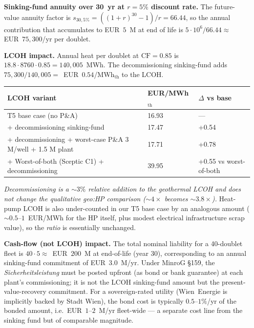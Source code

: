 \documentclass{article}
\begin{document}
\textbf{Sinking-fund annuity over 30~yr at $r = 5\%$ discount rate.}
The future-value annuity factor is
$s_{30,5\%} = ((1+r)^{30} - 1)/r = 66.44$, so the annual contribution
that accumulates to EUR~$5$~M at end of life is
$5 \cdot 10^{6} / 66.44 \approx$ EUR~$75{,}300$/yr per doublet.

\textbf{LCOH impact.} Annual heat per doublet at $\mathrm{CF}=0.85$ is
$18.8 \cdot 8760 \cdot 0.85 = 140{,}005$~MWh. The decommissioning
sinking-fund adds
$75{,}300 / 140{,}005 = $~EUR~$0.54$/MWh$_{\mathrm{th}}$ to the LCOH.

\begin{center}
\begin{tabular}{lll}
\hline
\textbf{LCOH variant} & \textbf{EUR/MWh$_{\mathrm{th}}$} & \textbf{$\Delta$ vs base} \\
\hline
T5 base case (no P\&A)                & 16.93 & --- \\
+ decommissioning sinking-fund        & 17.47 & +0.54 \\
+ decommissioning + worst-case P\&A 3 M/well + 1.5 M plant & 17.71 & +0.78 \\
+ Worst-of-both (Sceptic C1) + decommissioning & 39.95 & +0.55 vs worst-of-both \\
\hline
\end{tabular}
\end{center}

\emph{Decommissioning is a $\sim 3\%$ relative addition to the
geothermal LCOH and does not change the qualitative geo:HP comparison
($\sim 4\times$ becomes $\sim 3.8\times$).} Heat-pump LCOH is also
under-counted in our T5 base case by an analogous amount
($\sim 0.5$--$1$~EUR/MWh for the HP itself, plus modest electrical
infrastructure scrap value), so the \emph{ratio} is essentially
unchanged.

\textbf{Cash-flow (not LCOH) impact.} The total nominal liability for
a 40-doublet fleet is $40 \cdot 5 \approx$~EUR~$200$~M at end-of-life
(year 30), corresponding to an annual sinking-fund commitment of
EUR~$3.0$~M/yr. Under MinroG §159, the \emph{Sicherheitsleistung}
must be posted upfront (as bond or bank guarantee) at each
plant's commissioning; it is not the LCOH sinking-fund amount but
the present-value-recovery commitment. For a sovereign-rated
utility (Wien~Energie is implicitly backed by Stadt Wien), the
bond cost is typically $0.5$--$1\%$/yr of the bonded amount, i.e.\
EUR~$1$--$2$~M/yr fleet-wide --- a separate cost line from the
sinking fund but of comparable magnitude.
\end{document}
